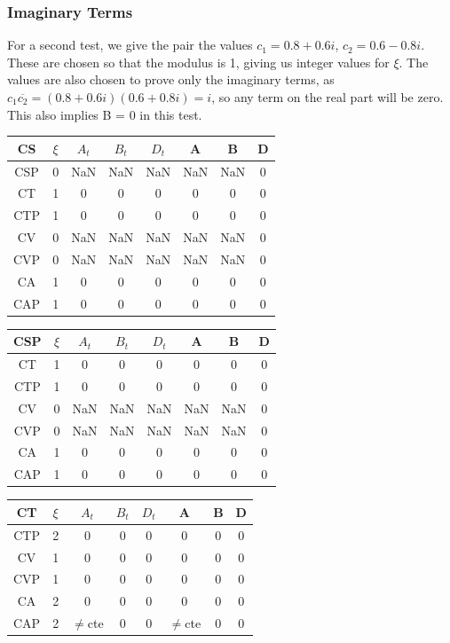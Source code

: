 \documentclass[twocolumn]{article}
\begin{document}
\subsubsection{Imaginary Terms}

For a second test, we give the pair the values $c_1 = 0.8 + 0.6i$, $c_2 = 0.6 - 0.8i$. These are chosen so that the modulus is 1, giving us integer values for $\xi$. The values are also chosen to prove only the imaginary terms, as $c_1\overline{c_2} = (0.8+0.6i)(0.6+0.8i) = i$, so any term on the real part will be zero. This also implies B = 0 in this test.

\begin{table}[H]
	\begin{tabular}{|c|c|c|c|c|c|c|c|}
		\hline
		CS & $\xi $& $A_t$ & $B_t$ & $D_t$ & A & B & D \\
		\hline
		CSP & 0 & NaN & NaN & NaN & NaN & NaN & 0\\
		\hline
		CT & 1 & 0 & 0 & 0 & 0 & 0 & 0\\
		\hline
		CTP & 1 & 0 & 0 & 0 & 0 & 0 & 0\\
		\hline
		CV & 0 & NaN & NaN & NaN & NaN & NaN & 0\\
		\hline
		CVP & 0 & NaN & NaN & NaN & NaN & NaN & 0\\
		\hline
		CA & 1 & 0 & 0 & 0 & 0 & 0 & 0\\
		\hline
		CAP & 1 & 0 & 0 & 0 & 0 & 0 & 0\\
		\hline
	\end{tabular}
\end{table}

\begin{table}[H]
	\begin{tabular}{|c|c|c|c|c|c|c|c|}
		\hline
		CSP & $\xi $& $A_t$ & $B_t$ & $D_t$ & A & B & D \\
		\hline
		CT & 1 & 0 & 0 & 0 & 0 & 0 & 0\\
		\hline
		CTP & 1 & 0 & 0 & 0 & 0 & 0 & 0\\
		\hline
		CV & 0 & NaN & NaN & NaN & NaN & NaN & 0\\
		\hline
		CVP & 0 & NaN & NaN & NaN & NaN & NaN & 0\\
		\hline
		CA & 1 & 0 & 0 & 0 & 0 & 0 & 0\\
		\hline
		CAP & 1 & 0 & 0 & 0 & 0 & 0 & 0\\
		\hline
	\end{tabular}
\end{table}

\begin{table}[H]
	\begin{tabular}{|c|c|c|c|c|c|c|c|}
		\hline
		CT & $\xi $& $A_t$ & $B_t$ & $D_t$ & A & B & D \\
		\hline
		CTP & 2 & 0 & 0 & 0 & 0 & 0 & 0\\
		\hline
		CV & 1 & 0 & 0 & 0 & 0 & 0 & 0\\
		\hline
		CVP & 1 & 0 & 0 & 0 & 0 & 0 & 0\\
		\hline
		CA & 2 & 0 & 0 & 0 & 0 & 0 & 0\\
		\hline
		CAP & 2 & $\neq$cte & 0 & 0 & $\neq$cte & 0 & 0\\
		\hline
	\end{tabular}
\end{table}
\end{document}

